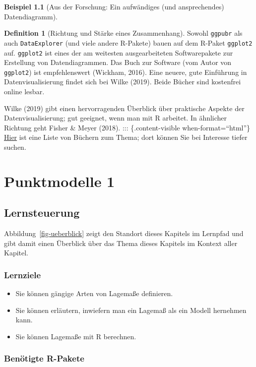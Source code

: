 \documentclass[
  a4paper,
]{scrbook}
\providecommand{\tightlist}{%
  \setlength{\itemsep}{0pt}\setlength{\parskip}{0pt}}\usepackage{longtable,booktabs,array}
\theoremstyle{definition}
\newtheorem{example}{Beispiel}[chapter]
\theoremstyle{definition}
\newtheorem{definition}{Definition}[chapter]
\theoremstyle{definition}
\theoremstyle{remark}
\begin{document}
\begin{example}[Aus der Forschung: Ein aufwändiges (und ansprechendes)
Datendiagramm]
\begin{definition}[Richtung und Stärke eines
Zusammenhang]
Sowohl \texttt{ggpubr} als auch \texttt{DataExplorer} (und viele andere
R-Pakete) bauen auf dem R-Paket \texttt{ggplot2} auf. \texttt{ggplot2}
ist eines der am weitesten ausgearbeiteten Softwarepakete zur Erstellung
von Datendiagrammen. Das Buch zur Software (vom Autor von
\texttt{ggplot2}) ist empfehlenswert (Wickham, 2016). Eine neuere, gute
Einführung in Datenvisualisierung findet sich bei Wilke (2019). Beide
Bücher sind kostenfrei online lesbar.

Wilke (2019) gibt einen hervorragenden Überblick über praktische Aspekte
der Datenvisualisierung; gut geeignet, wenn man mit R arbeitet. In
ähnlicher Richtung geht Fisher \& Meyer (2018). ::: \{.content-visible
when-format=``html''\}
\href{https://www.bing.com/search?pc=OA1&q=introductory\%20books\%20on\%20data\%20visualization\%20with\%20DOI}{Hier}
ist eine Liste von Büchern zum Thema; dort können Sie bei Interesse
tiefer suchen.

\end{definition}

\chapter{Punktmodelle 1}\label{sec-punktmodelle1}

\section{Lernsteuerung}\label{lernsteuerung-4}

Abbildung~\ref{fig-ueberblick} zeigt den Standort dieses Kapitels im
Lernpfad und gibt damit einen Überblick über das Thema dieses Kapitels
im Kontext aller Kapitel.

\subsection{Lernziele}\label{lernziele-5}

\begin{itemize}
\tightlist
\item
  Sie können gängige Arten von Lagemaße definieren.
\item
  Sie können erläutern, inwiefern man ein Lagemaß als ein Modell
  hernehmen kann.
\item
  Sie können Lagemaße mit R berechnen.
\end{itemize}

\subsection{Benötigte R-Pakete}\label{benuxf6tigte-r-pakete-2}


\end{example}
\end{document}
